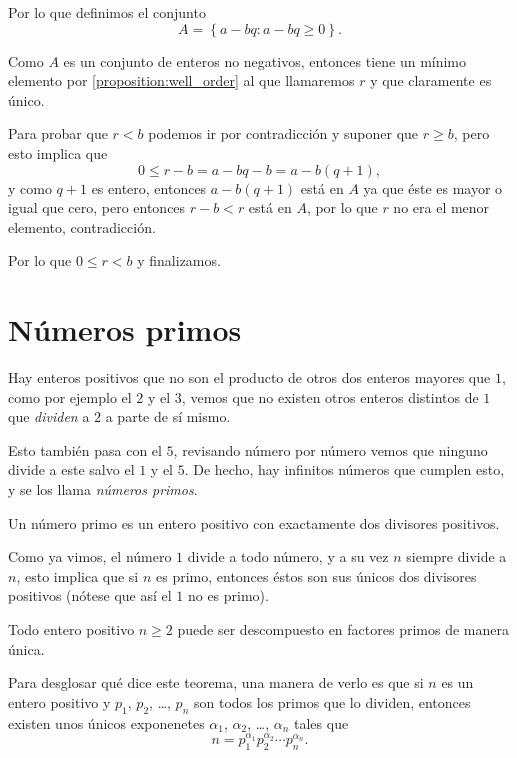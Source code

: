 Por lo que definimos el conjunto
\[A = \left\{a - bq \colon a - bq \geq 0\right\}.\]

Como $A$ es un conjunto de enteros no
negativos, entonces tiene un mínimo
elemento por \autoref{proposition:well_order}
al que llamaremos $r$ y que claramente es
único.

Para probar que $r < b$ podemos ir por
contradicción y suponer que $r \geq b$,
pero esto implica que
\[0 \leq r - b = a - bq - b = a - b(q + 1),\]
y como $q + 1$ es entero, entonces
$a - b(q + 1)$ está en $A$ ya que éste
es mayor o igual que cero,
pero entonces $r - b < r$
está en $A$, por lo que $r$
no era el menor elemento, contradicción.

Por lo que $0 \leq r < b$ y finalizamos.

\section{Números primos}
Hay enteros positivos que no son el
producto de otros dos enteros mayores que $1$,
como por ejemplo el $2$ y el $3$,
vemos que no existen otros enteros
distintos de $1$ que \textit{dividen}
a $2$ a parte de sí mismo.

Esto también pasa con el $5$, revisando número
por número vemos que ninguno divide a este
salvo el $1$ y el $5$. De hecho, hay infinitos
números que cumplen esto, y se los
llama \textit{números primos}.

\begin{definition}
	Un número primo es un entero positivo con
	exactamente dos divisores positivos.
\end{definition}

Como ya vimos, el número $1$ divide a todo número,
y a su vez $n$ siempre divide a $n$, esto implica
que si $n$ es primo, entonces éstos son sus únicos
dos divisores positivos (nótese que así el $1$ no es primo).

\begin{theorem}
	Todo entero positivo $n \geq 2$ puede ser descompuesto
	en factores primos de manera única.
\end{theorem}

Para desglosar qué dice este teorema,
una manera de verlo es que si $n$ es un
entero positivo y $p_1$, $p_2$, \dots, $p_n$
son todos los primos que lo dividen, entonces
existen unos únicos exponenetes $\alpha_1$, $\alpha_2$,
\dots, $\alpha_n$ tales que
\[n = p_1^{\alpha_1}p_2^{\alpha_2}\cdots p_n^{\alpha_n}.\]


